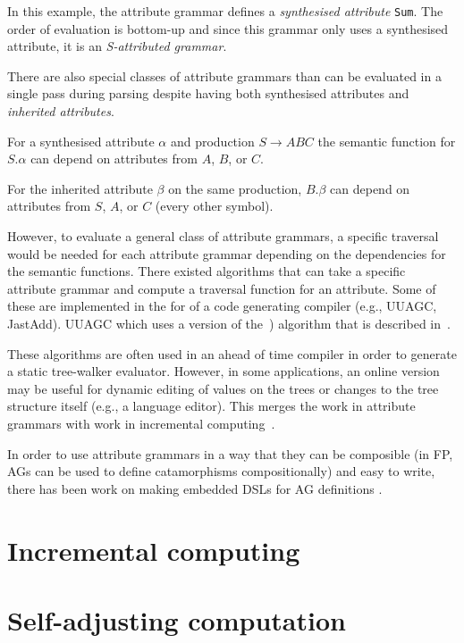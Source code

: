 \documentclass{article}
\theoremstyle{definition}
\newif\ifusenatbib
\begin{document}
In this example, the attribute grammar defines a \emph{synthesised
attribute} \texttt{Sum}. The order of evaluation is bottom-up and
since this grammar only uses a synthesised attribute, it is an
\emph{S-attributed grammar}.

There are also special classes of attribute grammars than can be
evaluated in a single pass during parsing despite having both
synthesised attributes and \emph{inherited attributes}.

For a synthesised attribute \(\alpha\) and production \( S \to ABC
\) the semantic function for \(S.\alpha\) can depend on attributes
from \(A\), \(B\), or \(C\).

For the inherited attribute \(\beta\) on the same production,
\(B.\beta\) can depend on attributes from \(S\), \(A\), or \(C\)
(every other symbol).

However, to evaluate a general class of attribute grammars, a
specific traversal would be needed for each attribute grammar
depending on the dependencies for the semantic functions. There
existed algorithms that can take a specific attribute grammar and
compute a traversal function for an attribute. Some of these are
implemented in the for of a code generating compiler (e.g., UUAGC,
JastAdd). UUAGC which uses a version of
the~\cite{kennedy1976automatic}) algorithm that is described
in~\cite{bransen2012kennedy}.

These algorithms are often used in an ahead of time compiler in
order to generate a static tree-walker evaluator. However, in some
applications, an online version may be useful for dynamic editing
of values on the trees or changes to the tree structure itself
(e.g., a language editor). This merges the work in attribute
grammars with work in incremental
computing~\cite{reps1983incremental,ramalingam1993categorized}.

In order to use attribute grammars in a way that they can be
composible (in FP, AGs can be used to define catamorphisms
compositionally) and easy to write, there has been work on making
embedded DSLs for AG definitions \cite{sloane2010pure}.


\section{Incremental computing}

\section{Self-adjusting computation}


\ifusenatbib
	
\else
	\printbibliography
\fi
\end{document}
